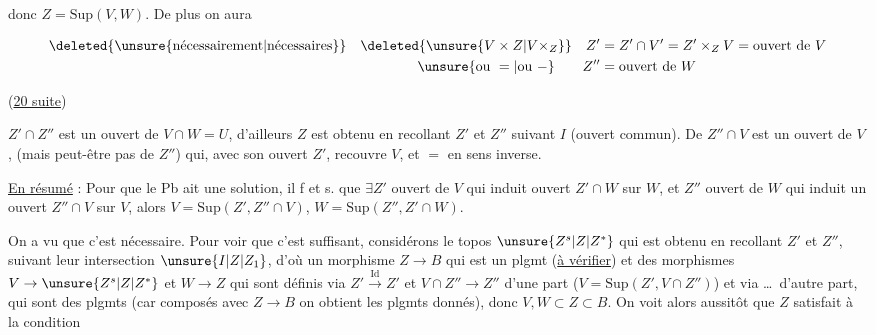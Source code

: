 donc $Z=\mathrm{Sup}(V,W)$. De plus on aura 

\[
 \begin{aligned}
 \deleted{\text{\unsure{nécessairement|nécessaires}}}\quad
 \deleted{\ensuremath{\unsure{V\times Z|V\times_Z}}}\quad
 Z'&=Z'\cap V'=Z'\times_Z V=\text{ouvert de }V\\
 \unsure{\text{ou }=|\text{ou }-}\qquad Z''&=\text{ouvert de }W
 \end{aligned}
\]


(\uline{20 suite})

$Z'\cap Z''$ est un ouvert  de $V\cap W=U$, d'ailleurs $Z$ est obtenu en recollant $Z'$ et $Z''$ suivant $I$ (ouvert commun). De  $Z''\cap V$ est un ouvert de $V$, (mais peut-être pas de $Z''$) qui, avec son ouvert $Z'$, recouvre $V$, et $=$ en sens inverse.


\uline{En résumé} : Pour que le Pb ait une solution, il f et s.  que $\exists Z'$  ouvert de $V$ qui induit  ouvert  $Z'\cap W$ sur $W$, et $Z''$  ouvert de $W$ qui induit un ouvert $Z''\cap V$ sur $V$, alors $V=\mathrm{Sup}(Z',Z''\cap V)$, $W=\mathrm{Sup}(Z'',Z'\cap W)$.

On a vu que c'est nécessaire. Pour voir que c'est suffisant, considérons le topos $\unsure{Z^s|Z|Z^*}$ qui est obtenu en recollant $Z'$ et $Z''$, suivant leur intersection $\unsure{I|Z|Z_1}$, d'où un morphisme $Z\to B$ qui est un plgmt (\uline{à vérifier}) et des morphismes $V\to\unsure{Z^s|Z|Z^*}$ et $W\to Z$ qui sont définis via $Z'\xrightarrow{\mathrm{Id}}Z'$ et $V\cap Z''\longrightarrow Z''$  d'une part ($V=\mathrm{Sup}(Z',V\cap Z'')$) et via \ldots\ d'autre part, qui sont des plgmts (car composés avec $Z\to B$ on obtient les plgmts donnés), donc $V,W\subset Z\subset B$. On voit alors aussitôt que $Z$ satisfait à la condition


